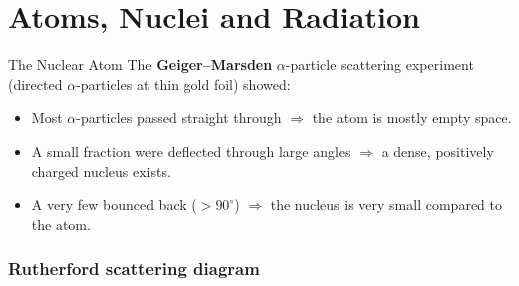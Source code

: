 

\section{Atoms, Nuclei and Radiation}

\begin{definitionbox}{The Nuclear Atom}
The \textbf{Geiger--Marsden} $\alpha$-particle scattering experiment (directed $\alpha$-particles at thin gold foil) showed:
\begin{itemize}[itemsep=2pt]
  \item Most $\alpha$-particles passed straight through $\Rightarrow$ the atom is mostly empty space.
  \item A small fraction were deflected through large angles $\Rightarrow$ a dense, positively charged nucleus exists.
  \item A very few bounced back ($> 90^\circ$) $\Rightarrow$ the nucleus is very small compared to the atom.
\end{itemize}
\end{definitionbox}

\subsubsection*{Rutherford scattering diagram}

